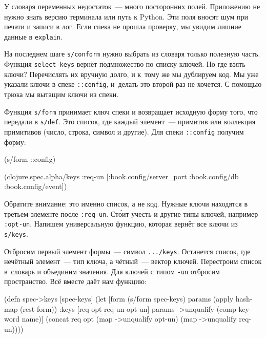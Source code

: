 У словаря переменных недостаток~--- много посторонних полей. Приложению не нужно
знать версию терминала или путь к Python. Эти поля вносят шум при печати и
записи в лог. Если спека не прошла проверку, мы увидим лишние данные в
\verb|explain|.


На последнем шаге \verb|s/conform| нужно выбрать из словаря только полезную
часть. Функция \verb|select-keys| вернёт подмножество по списку ключей. Но где
взять ключи? Перечислять их вручную долго, и к~тому же мы дублируем код. Мы уже
указали ключи в спеке \verb|::config|, и~делать это второй раз не хочется. С
помощью трюка мы вытащим ключи из спеки.

Функция \verb|s/form| принимает ключ спеки и возвращает исходную форму того, что
передали в \verb|s/def|. Это список, где каждый элемент~--- примитив или
коллекция примитивов (число, строка, символ и другие). Для спеки \verb|::config|
получим форму:

\begin{english}
  \begin{clojure}
(s/form ::config)

(clojure.spec.alpha/keys
 :req-un [:book.config/server_port
          :book.config/db
          :book.config/event])
  \end{clojure}
\end{english}


Обратите внимание: это именно список, а не код. Нужные ключи находятся в третьем
элементе после \verb|:req-un|. Ст\'{о}ит учесть и другие типы ключей, например
\verb|:opt-un|. Напишем универсальную функцию, которая вернёт все ключи из
\verb|s/keys|.

Отбросим первый элемент формы~--- символ \verb|.../keys|. Останется список, где
нечётный элемент~--- тип ключа, а чётный~--- вектор ключей. Перестроим список
в~словарь и объединим значения. Для ключей с типом \verb|-un| отбросим
пространство. Всё вместе даёт нам функцию:


\ifnarrow

\begin{english}
  \begin{clojure}
(defn spec->keys
  [spec-keys]
  (let [form (s/form spec-keys)
        params (apply hash-map
                 (rest form))
        {:keys [req opt req-un opt-un]}
        params
        ->unqualify (comp keyword name)]
    (concat req
            opt
            (map ->unqualify opt-un)
            (map ->unqualify req-un))))
  \end{clojure}
\end{english}

